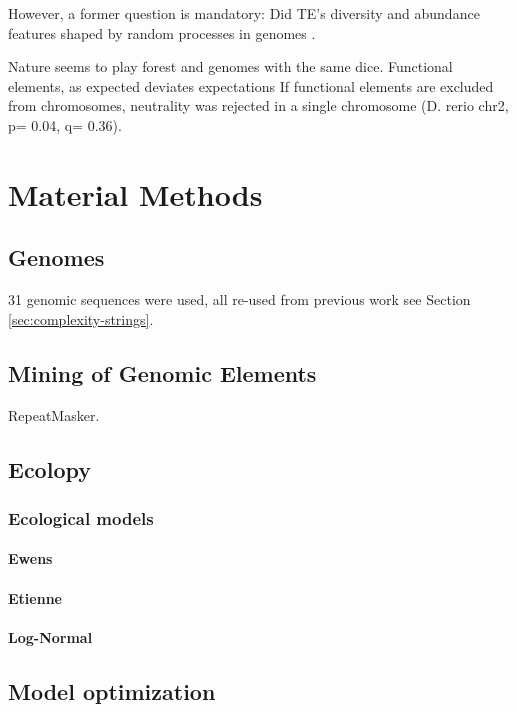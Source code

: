 However, a former question is mandatory: Did TE's diversity and abundance features shaped by random processes in genomes \cite{Lynch2003,Venner2009}. 

Nature seems to play forest and genomes with the same dice.
Functional elements, as expected deviates expectations If functional elements are excluded from chromosomes, neutrality was rejected in a single chromosome (D. rerio chr2, p= 0.04, q= 0.36).


\section{Material Methods}

\subsection{Genomes}

31 genomic sequences were used, all re-used from previous work see Section \ref{sec:complexity-strings}.

\subsection{Mining of Genomic Elements}

RepeatMasker.

\subsection{Ecolopy}

\subsubsection{Ecological models}

\paragraph{Ewens}

\paragraph{Etienne}

\paragraph{Log-Normal}

\subsection{Model optimization}
\label{sec:model-optimization}


